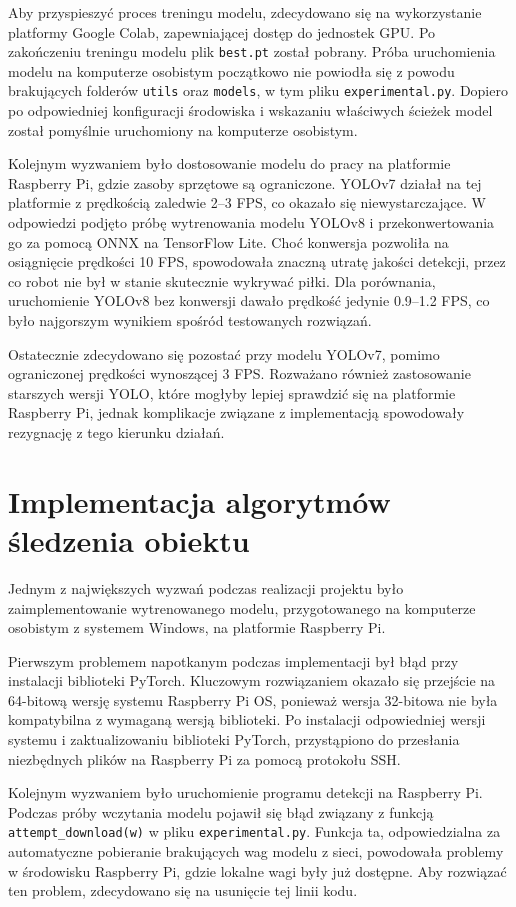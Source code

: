 \documentclass[a4paper,twoside,12pt]{book}
\begin{document}
Aby przyspieszyć proces treningu modelu, zdecydowano się na wykorzystanie platformy Google Colab, zapewniającej dostęp do jednostek GPU. Po zakończeniu treningu modelu plik \texttt{best.pt} został pobrany. Próba uruchomienia modelu na komputerze osobistym początkowo nie powiodła się z powodu brakujących folderów \texttt{utils} oraz \texttt{models}, w tym pliku \texttt{experimental.py}. Dopiero po odpowiedniej konfiguracji środowiska i wskazaniu właściwych ścieżek model został pomyślnie uruchomiony na komputerze osobistym.

Kolejnym wyzwaniem było dostosowanie modelu do pracy na platformie Raspberry Pi, gdzie zasoby sprzętowe są ograniczone. YOLOv7 działał na tej platformie z prędkością zaledwie 2–3 FPS, co okazało się niewystarczające. W odpowiedzi podjęto próbę wytrenowania modelu YOLOv8 i przekonwertowania go za pomocą ONNX na TensorFlow Lite. Choć konwersja pozwoliła na osiągnięcie prędkości 10 FPS, spowodowała znaczną utratę jakości detekcji, przez co robot nie był w stanie skutecznie wykrywać piłki. Dla porównania, uruchomienie YOLOv8 bez konwersji dawało prędkość jedynie 0.9–1.2 FPS, co było najgorszym wynikiem spośród testowanych rozwiązań.

Ostatecznie zdecydowano się pozostać przy modelu YOLOv7, pomimo ograniczonej prędkości wynoszącej 3 FPS. Rozważano również zastosowanie starszych wersji YOLO, które mogłyby lepiej sprawdzić się na platformie Raspberry Pi, jednak komplikacje związane z implementacją spowodowały rezygnację z tego kierunku działań.


\section{Implementacja algorytmów śledzenia obiektu}

Jednym z największych wyzwań podczas realizacji projektu było zaimplementowanie wytrenowanego modelu, przygotowanego na komputerze osobistym z systemem Windows, na platformie Raspberry Pi.

Pierwszym problemem napotkanym podczas implementacji był błąd przy instalacji biblioteki PyTorch. Kluczowym rozwiązaniem okazało się przejście na 64-bitową wersję systemu Raspberry Pi OS, ponieważ wersja 32-bitowa nie była kompatybilna z wymaganą wersją biblioteki. Po instalacji odpowiedniej wersji systemu i zaktualizowaniu biblioteki PyTorch, przystąpiono do przesłania niezbędnych plików na Raspberry Pi za pomocą protokołu SSH.

Kolejnym wyzwaniem było uruchomienie programu detekcji na Raspberry Pi. Podczas próby wczytania modelu pojawił się błąd związany z funkcją \texttt{attempt\_download(w)} w pliku \texttt{experimental.py}. Funkcja ta, odpowiedzialna za automatyczne pobieranie brakujących wag modelu z sieci, powodowała problemy w środowisku Raspberry Pi, gdzie lokalne wagi były już dostępne. Aby rozwiązać ten problem, zdecydowano się na usunięcie tej linii kodu. 
\end{document}
